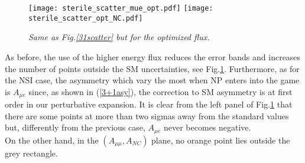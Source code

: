 \documentclass[12pt]{article}
\begin{document}
\begin{figure}
    \centering
    \texttt{[image: sterile\_scatter\_mue\_opt.pdf]}
    \texttt{[image: sterile\_scatter\_opt\_NC.pdf]}
    \caption{\it Same as Fig.\ref{31scatter} but for the optimized flux.}
    \label{31scatteropt}
\end{figure}

As before, the use of the higher energy flux 
reduces the error bands and increases the number of points outside the SM uncertainties, see Fig.\ref{31scatteropt}. 
Furthermore, as for the NSI case, the asymmetry which vary the most when NP enters into the game is $A_{\mu e}$ since, as shown in  (\ref{3+1asy}), the correction to SM asymmetry is at first order in our perturbative expansion. It is clear from the left panel of Fig.\ref{31scatteropt} that there are some points at more than two sigmas away from the standard values but, differently from the previous case, $A_{\mu e}$ never becomes negative. \\
On the other hand, in the $(A_{\mu\mu},A_{NC})$ plane,  no orange point lies outside the grey rectangle.
\end{document}
